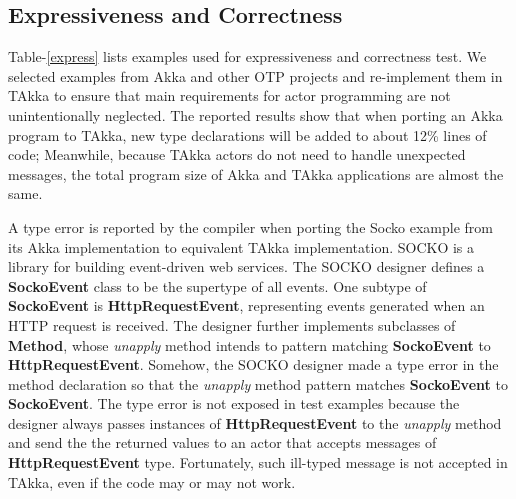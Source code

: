 \subsection{Expressiveness and Correctness}

Table-\ref{express} lists examples used for expressiveness and correctness test.
We selected examples from Akka and other OTP projects and re-implement them  in
TAkka to ensure that main requirements for actor programming are not
unintentionally neglected.  The reported results show that when porting an Akka
program to TAkka, new type declarations will be added to about 12\% lines of
code; Meanwhile, because TAkka actors do not need to handle unexpected messages,
the total program size of Akka and TAkka applications are almost the same.

A type error is reported by the compiler when porting the Socko example
\cite{SOCKO} from its Akka implementation to equivalent TAkka implementation.
SOCKO is a library for building event-driven web services.  The SOCKO designer
defines a {\bf SockoEvent} class to be the supertype of all events.  One
subtype of {\bf SockoEvent} is {\bf HttpRequestEvent}, representing events
generated when an HTTP request is received. The designer further implements
subclasses of {\bf Method}, whose {\it unapply} method intends to pattern
matching {\bf SockoEvent} to {\bf HttpRequestEvent}.  Somehow, the SOCKO
designer made a type error in the method declaration so that the {\it unapply}
method pattern matches {\bf SockoEvent} to {\bf SockoEvent}. The type error is
not exposed in test examples because the designer always passes instances of
{\bf HttpRequestEvent} to the {\it unapply} method and send the the returned
values to an actor that accepts messages of {\bf HttpRequestEvent} type.
Fortunately, such ill-typed message is not accepted in TAkka, even if the code
may or may not work.


